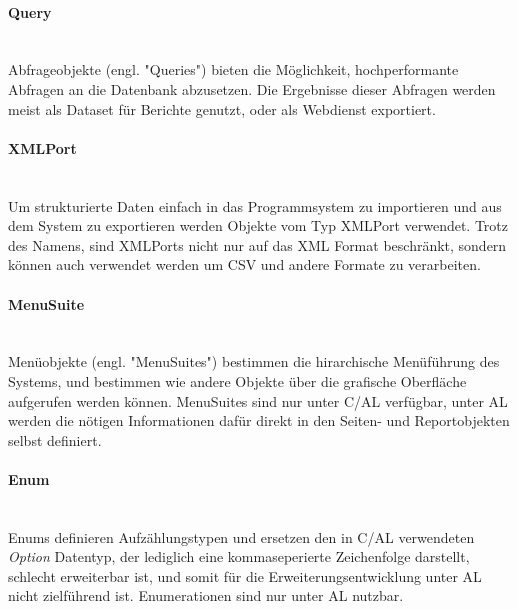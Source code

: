 \paragraph{Query} \mbox{}\\
Abfrageobjekte (engl. "Queries") bieten die Möglichkeit, hochperformante Abfragen an die Datenbank abzusetzen. Die Ergebnisse dieser Abfragen werden meist als Dataset für Berichte genutzt, oder als Webdienst exportiert.

\paragraph{XMLPort}\mbox{}\\
Um strukturierte Daten einfach in das Programmsystem zu importieren und aus dem System zu exportieren werden Objekte vom Typ XMLPort verwendet. Trotz des Namens, sind XMLPorts nicht nur auf das XML Format beschränkt, sondern können auch verwendet werden um CSV und andere Formate zu verarbeiten.

\paragraph{MenuSuite}\mbox{}\\
Menüobjekte (engl. "MenuSuites") bestimmen die hirarchische Menüführung des Systems, und bestimmen wie andere Objekte über die grafische Oberfläche aufgerufen werden können. MenuSuites sind nur unter C/AL verfügbar, unter AL werden die nötigen Informationen dafür direkt in den Seiten- und Reportobjekten selbst definiert.


\paragraph{Enum}\mbox{}\\
Enums definieren Aufzählungstypen und ersetzen den in C/AL verwendeten \textit{Option} Datentyp, der lediglich eine kommaseperierte Zeichenfolge darstellt, schlecht erweiterbar ist, und somit für die Erweiterungsentwicklung unter AL nicht zielführend ist. Enumerationen sind nur unter AL nutzbar.





























